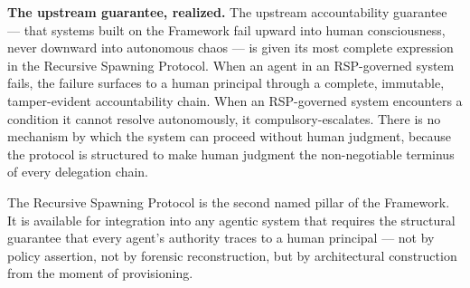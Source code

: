 \medskip
\noindent\textbf{The upstream guarantee, realized.} The upstream \bxthree accountability guarantee — that systems built on the \bxthree Framework fail upward into human consciousness, never downward into autonomous chaos — is given its most complete expression in the Recursive Spawning Protocol. When an agent in an RSP-governed system fails, the failure surfaces to a human principal through a complete, immutable, tamper-evident accountability chain. When an RSP-governed system encounters a condition it cannot resolve autonomously, it compulsory-escalates. There is no mechanism by which the system can proceed without human judgment, because the protocol is structured to make human judgment the non-negotiable terminus of every delegation chain.

The Recursive Spawning Protocol is the second named pillar of the \bxthree Framework. It is available for integration into any agentic system that requires the structural guarantee that every agent's authority traces to a human principal — not by policy assertion, not by forensic reconstruction, but by architectural construction from the moment of provisioning.

